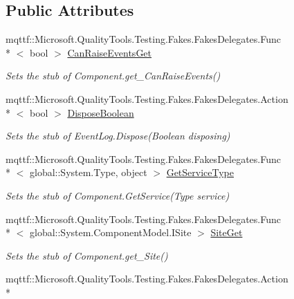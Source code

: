 \subsection*{Public Attributes}
\begin{DoxyCompactItemize}
\item 
mqttf\-::\-Microsoft.\-Quality\-Tools.\-Testing.\-Fakes.\-Fakes\-Delegates.\-Func\\*
$<$ bool $>$ \hyperlink{class_system_1_1_diagnostics_1_1_fakes_1_1_stub_event_log_a89682a035127270310dacfa763e89f57}{Can\-Raise\-Events\-Get}
\begin{DoxyCompactList}\small\item\em Sets the stub of Component.\-get\-\_\-\-Can\-Raise\-Events()\end{DoxyCompactList}\item 
mqttf\-::\-Microsoft.\-Quality\-Tools.\-Testing.\-Fakes.\-Fakes\-Delegates.\-Action\\*
$<$ bool $>$ \hyperlink{class_system_1_1_diagnostics_1_1_fakes_1_1_stub_event_log_ad5b5b942e107cc12a6cff423ef33b7c1}{Dispose\-Boolean}
\begin{DoxyCompactList}\small\item\em Sets the stub of Event\-Log.\-Dispose(\-Boolean disposing)\end{DoxyCompactList}\item 
mqttf\-::\-Microsoft.\-Quality\-Tools.\-Testing.\-Fakes.\-Fakes\-Delegates.\-Func\\*
$<$ global\-::\-System.\-Type, object $>$ \hyperlink{class_system_1_1_diagnostics_1_1_fakes_1_1_stub_event_log_af2a241e06f04a6f8738fb5f4d6bc1e2c}{Get\-Service\-Type}
\begin{DoxyCompactList}\small\item\em Sets the stub of Component.\-Get\-Service(\-Type service)\end{DoxyCompactList}\item 
mqttf\-::\-Microsoft.\-Quality\-Tools.\-Testing.\-Fakes.\-Fakes\-Delegates.\-Func\\*
$<$ global\-::\-System.\-Component\-Model.\-I\-Site $>$ \hyperlink{class_system_1_1_diagnostics_1_1_fakes_1_1_stub_event_log_afc608b16c8fe4fd0fa7e704df725c218}{Site\-Get}
\begin{DoxyCompactList}\small\item\em Sets the stub of Component.\-get\-\_\-\-Site()\end{DoxyCompactList}\item 
mqttf\-::\-Microsoft.\-Quality\-Tools.\-Testing.\-Fakes.\-Fakes\-Delegates.\-Action\\*

\end{DoxyCompactItemize}
